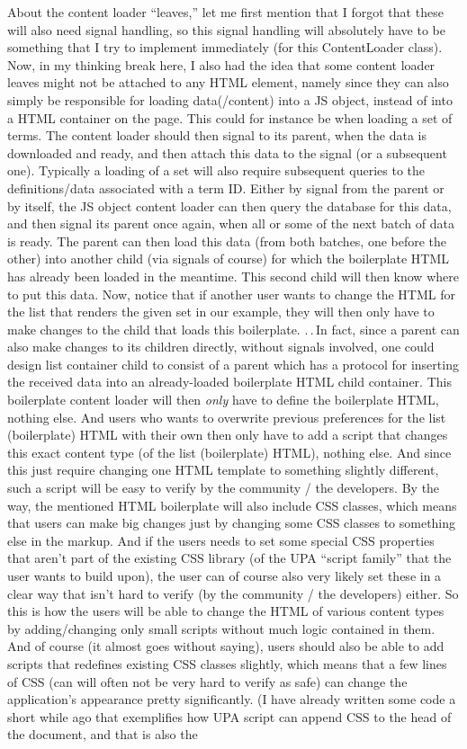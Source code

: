 \documentclass{report}
\begin{document}
About the content loader ``leaves,'' let me first mention that I forgot that these will also need signal handling, so this signal handling will absolutely have to be something that I try to implement immediately (for this ContentLoader class). Now, in my thinking break here, I also had the idea that some content loader leaves might not be attached to any HTML element, namely since they can also simply be responsible for loading data(/content) into a JS object, instead of into a HTML container on the page. This could for instance be when loading a set of terms. The content loader should then signal to its parent, when the data is downloaded and ready, and then attach this data to the signal (or a subsequent one). Typically a loading of a set will also require subsequent queries to the definitions/data associated with a term ID. Either by signal from the parent or by itself, the JS object content loader can then query the database for this data, and then signal its parent once again, when all or some of the next batch of data is ready. The parent can then load this data (from both batches, one before the other) into another child (via signals of course) for which the boilerplate HTML has already been loaded in the meantime. This second child will then know where to put this data. Now, notice that if another user wants to change the HTML for the list that renders the given set in our example, they will then only have to make changes to the child that loads this boilerplate. .\,.\,In fact, since a parent can also make changes to its children directly, without signals involved, one could design list container child to consist of a parent which has a protocol for inserting the received data into an already-loaded boilerplate HTML child container. This boilerplate content loader will then \emph{only} have to define the boilerplate HTML, nothing else. And users who wants to overwrite previous preferences for the list (boilerplate) HTML with their own then only have to add a script that changes this exact content type (of the list (boilerplate) HTML), nothing else. And since this just require changing one HTML template to something slightly different, such a script will be easy to verify by the community / the developers. By the way, the mentioned HTML boilerplate will also include CSS classes, which means that users can make big changes just by changing some CSS classes to something else in the markup. And if the users needs to set some special CSS properties that aren't part of the existing CSS library (of the UPA ``script family'' that the user wants to build upon), the user can of course also very likely set these in a clear way that isn't hard to verify (by the community / the developers) either. So this is how the users will be able to change the HTML of various content types by adding/changing only small scripts without much logic contained in them. And of course (it almost goes without saying), users should also be able to add scripts that redefines existing CSS classes slightly, which means that a few lines of CSS (can will often not be very hard to verify as safe) can change the application's appearance pretty significantly. (I have already written some code a short while ago that exemplifies how UPA script can append CSS to the head of the document, and that is also the 
\end{document}
